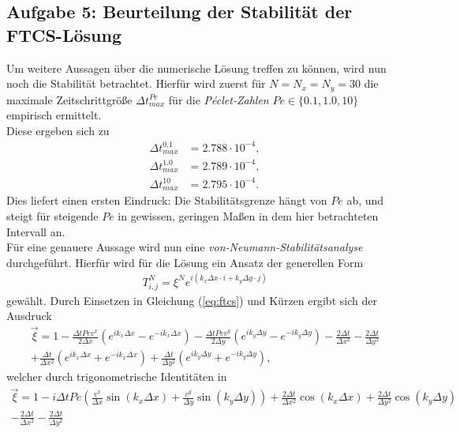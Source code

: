 \documentclass[12pt,a4paper,titlepage,headinclude,bibtotoc]{scrartcl}
\begin{document}
\subsection{Aufgabe 5: Beurteilung der Stabilität der FTCS-Lösung}
\label{sec:task5}
Um weitere Aussagen über die numerische Lösung treffen zu können, wird nun noch die Stabilität betrachtet. Hierfür wird zuerst für $N=N_x=N_y = 30$ die maximale Zeitschrittgröße $\Delta t^{Pe}_{max}$ für die \textit{Péclet-Zahlen} $Pe \in \{0.1, 1.0, 10\}$ empirisch ermittelt.\\
Diese ergeben sich zu
\begin{align*}
\Delta t^{0.1}_{max} &= 2.788 \cdot 10^{-4}, \\
\Delta t^{1.0}_{max} &= 2.789 \cdot 10^{-4}, \\
\Delta t^{10}_{max}  &= 2.795 \cdot 10^{-4} .
\end{align*}
Dies liefert einen ersten Eindruck: Die Stabilitätsgrenze hängt von $Pe$ ab, und steigt für steigende $Pe$ in gewissen, geringen Maßen in dem hier betrachteten Intervall an.\\
Für eine genauere Aussage wird nun eine \textit{von-Neumann-Stabilitätsanalyse} durchgeführt. Hierfür wird für die Lösung ein Ansatz der generellen Form
\begin{align*}
T^N_{i,j} = \xi^N e^{i(k_x \Delta x \cdot i + k_y \Delta y \cdot j)}
\end{align*}
gewählt.
Durch Einsetzen in Gleichung (\ref{eq:ftcs}) und Kürzen ergibt sich der Ausdruck
\begin{align*}
\vec{\xi} = 1 - \frac{\Delta t Pe v^x}{2 \Delta x} \left( e^{i k_x \Delta x} - e^{-i k_x \Delta x} \right) - \frac{\Delta t Pe v^y}{2 \Delta y} \left( e^{i k_y \Delta y} - e^{-i k_y \Delta y} \right) -\frac{2 \Delta t}{\Delta x^2} - \frac{2 \Delta t}{\Delta y^2} \\
 + \frac{\Delta t}{\Delta x^2} \left( e^{i k_x \Delta x} + e^{-i k_x \Delta x} \right) +\frac{\Delta t}{\Delta y^2} \left( e^{i k_y \Delta y} + e^{-i k_y \Delta y} \right),
\end{align*}
welcher durch trigonometrische Identitäten in
\begin{align*}
\vec{\xi} = 1 - i \Delta t Pe\left(\frac{ v^x }{\Delta x} \sin(k_x \Delta x) + \frac{v^y}{\Delta y}  \sin(k_y \Delta y) \right) + \frac{2 \Delta t}{\Delta x^2}\cos(k_x \Delta x) + \frac{2 \Delta t}{\Delta y^2}\cos(k_y \Delta y) \\-\frac{2 \Delta t}{\Delta x^2} - \frac{2 \Delta t}{\Delta y^2}
\end{align*}
\end{document}
